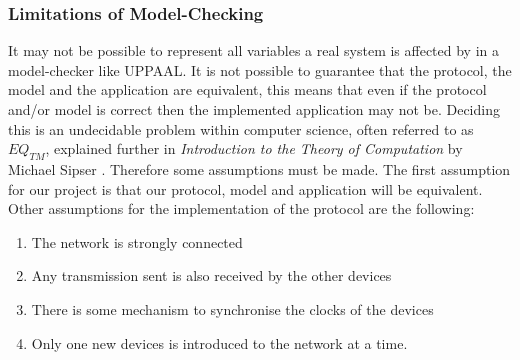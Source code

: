 \subsubsection{Limitations of Model-Checking}

It may not be possible to represent all variables a real system is affected by in a model-checker like UPPAAL.
It is not possible to guarantee that the protocol, the model and the application are equivalent, this means that even if the protocol and/or model is correct then the implemented application may not be. 
Deciding this is an undecidable problem within computer science, often referred to as $EQ_{TM}$, explained further in \textit{Introduction to the Theory of Computation} by Michael Sipser \citep[p. 220]{Sipser}.
Therefore some assumptions must be made. 
The first assumption for our project is that our protocol, model and application will be equivalent.
Other assumptions for the implementation of the protocol are the following: 
\begin{enumerate}[label=\itshape \alph*\upshape)]
    \item The network is strongly connected
    \item Any transmission sent is also received by the other devices
    \item There is some mechanism to synchronise the clocks of the devices
    \item Only one new devices is introduced to the network at a time.
\end{enumerate}
